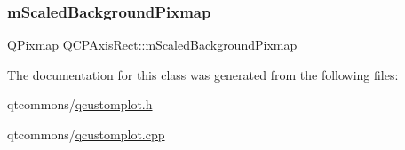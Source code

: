 \mbox{\label{class_q_c_p_axis_rect_aa74b9415598d59b49290e41e42d7ee27}} 
\subsubsection{\texorpdfstring{mScaledBackgroundPixmap}{mScaledBackgroundPixmap}}
{\footnotesize\ttfamily Q\+Pixmap Q\+C\+P\+Axis\+Rect\+::m\+Scaled\+Background\+Pixmap\hspace{0.3cm}{\ttfamily [protected]}}



The documentation for this class was generated from the following files\+:\begin{DoxyCompactItemize}
\item 
qtcommons/\mbox{\hyperlink{qcustomplot_8h}{qcustomplot.\+h}}\item 
qtcommons/\mbox{\hyperlink{qcustomplot_8cpp}{qcustomplot.\+cpp}}\end{DoxyCompactItemize}
